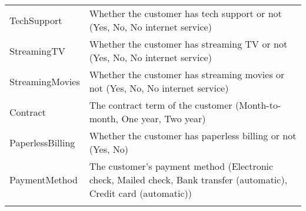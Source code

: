 \documentclass[]{article}
\begin{document}
\begin{longtable}[]{@{}ll@{}}
\begin{minipage}[t]{0.22\columnwidth}\raggedright\strut
TechSupport\strut
\end{minipage} & \begin{minipage}[t]{0.72\columnwidth}\raggedright\strut
Whether the customer has tech support or not (Yes, No, No internet
service)\strut
\end{minipage}\tabularnewline
\begin{minipage}[t]{0.22\columnwidth}\raggedright\strut
StreamingTV\strut
\end{minipage} & \begin{minipage}[t]{0.72\columnwidth}\raggedright\strut
Whether the customer has streaming TV or not (Yes, No, No internet
service)\strut
\end{minipage}\tabularnewline
\begin{minipage}[t]{0.22\columnwidth}\raggedright\strut
StreamingMovies\strut
\end{minipage} & \begin{minipage}[t]{0.72\columnwidth}\raggedright\strut
Whether the customer has streaming movies or not (Yes, No, No internet
service)\strut
\end{minipage}\tabularnewline
\begin{minipage}[t]{0.22\columnwidth}\raggedright\strut
Contract\strut
\end{minipage} & \begin{minipage}[t]{0.72\columnwidth}\raggedright\strut
The contract term of the customer (Month-to-month, One year, Two
year)\strut
\end{minipage}\tabularnewline
\begin{minipage}[t]{0.22\columnwidth}\raggedright\strut
PaperlessBilling\strut
\end{minipage} & \begin{minipage}[t]{0.72\columnwidth}\raggedright\strut
Whether the customer has paperless billing or not (Yes, No)\strut
\end{minipage}\tabularnewline
\begin{minipage}[t]{0.22\columnwidth}\raggedright\strut
PaymentMethod\strut
\end{minipage} & \begin{minipage}[t]{0.72\columnwidth}\raggedright\strut
The customer's payment method (Electronic check, Mailed check, Bank
transfer (automatic), Credit card (automatic))\strut
\end{minipage}\tabularnewline
\begin{minipage}[t]{0.22\columnwidth}\raggedright\strut

\end{minipage}
\end{longtable}
\end{document}
